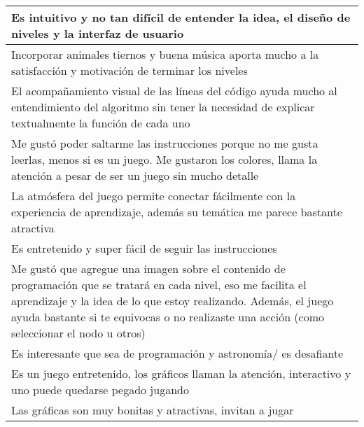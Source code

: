 \begin{table}[h]
\begin{tabular}{|p{\linewidth}|}
   Es intuitivo y no tan difícil de entender la idea, el diseño de niveles y la interfaz de usuario \\\hline
   Incorporar animales tiernos y buena música aporta mucho a la satisfacción y motivación de terminar los niveles \\\hline
   El acompañamiento visual de las líneas del código ayuda mucho al entendimiento del algoritmo sin tener la necesidad de explicar textualmente la función de cada uno \\\hline
   Me gustó poder saltarme las instrucciones porque no me gusta leerlas, menos si es un juego. Me gustaron los colores, llama la atención a pesar de ser un juego sin mucho detalle \\\hline
   La atmósfera del juego permite conectar fácilmente con la experiencia de aprendizaje, además su temática me parece bastante atractiva \\\hline
   Es entretenido y super fácil de seguir las instrucciones \\\hline
   Me gustó que agregue una imagen sobre el contenido de programación que se tratará en cada nivel, eso me facilita el aprendizaje y la idea de lo que estoy realizando. Además, el juego ayuda bastante si te equivocas o no realizaste una acción (como seleccionar el nodo u otros) \\\hline
   Es interesante que sea de programación y astronomía/ es desafiante \\\hline
   Es un juego entretenido, los gráficos llaman la atención, interactivo y uno puede quedarse pegado jugando \\\hline
   Las gráficas son muy bonitas y atractivas, invitan a jugar  \\
   \hline
   \end{tabular}
\end{table}

\restoregeometry


